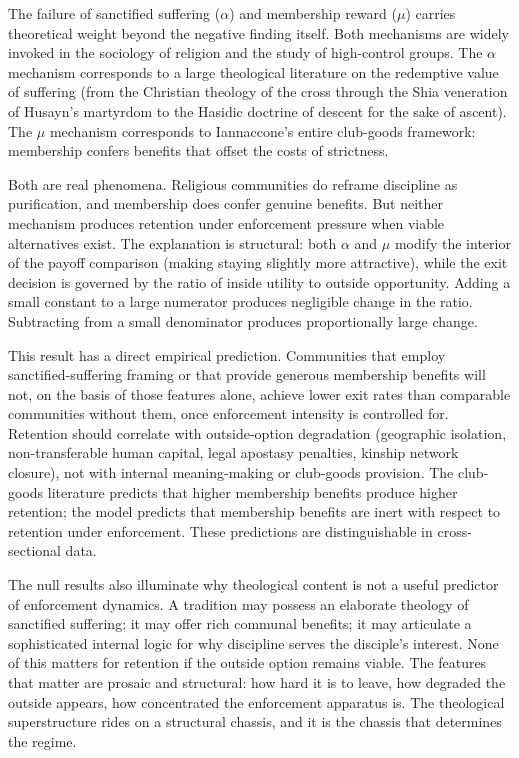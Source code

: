 \documentclass[12pt]{article}
\begin{document}
The failure of sanctified suffering ($\alpha$) and membership reward ($\mu$) carries theoretical weight beyond the negative finding itself. Both mechanisms are widely invoked in the sociology of religion and the study of high-control groups. The $\alpha$ mechanism corresponds to a large theological literature on the redemptive value of suffering (from the Christian theology of the cross through the Shia veneration of Husayn's martyrdom to the Hasidic doctrine of descent for the sake of ascent). The $\mu$ mechanism corresponds to Iannaccone's entire club-goods framework: membership confers benefits that offset the costs of strictness.

Both are real phenomena. Religious communities do reframe discipline as purification, and membership does confer genuine benefits. But neither mechanism produces retention under enforcement pressure when viable alternatives exist. The explanation is structural: both $\alpha$ and $\mu$ modify the interior of the payoff comparison (making staying slightly more attractive), while the exit decision is governed by the ratio of inside utility to outside opportunity. Adding a small constant to a large numerator produces negligible change in the ratio. Subtracting from a small denominator produces proportionally large change.

This result has a direct empirical prediction. Communities that employ sanctified-suffering framing or that provide generous membership benefits will not, on the basis of those features alone, achieve lower exit rates than comparable communities without them, once enforcement intensity is controlled for. Retention should correlate with outside-option degradation (geographic isolation, non-transferable human capital, legal apostasy penalties, kinship network closure), not with internal meaning-making or club-goods provision. The club-goods literature predicts that higher membership benefits produce higher retention; the model predicts that membership benefits are inert with respect to retention under enforcement. These predictions are distinguishable in cross-sectional data.

The null results also illuminate why theological content is not a useful predictor of enforcement dynamics. A tradition may possess an elaborate theology of sanctified suffering; it may offer rich communal benefits; it may articulate a sophisticated internal logic for why discipline serves the disciple's interest. None of this matters for retention if the outside option remains viable. The features that matter are prosaic and structural: how hard it is to leave, how degraded the outside appears, how concentrated the enforcement apparatus is. The theological superstructure rides on a structural chassis, and it is the chassis that determines the regime.
\end{document}
